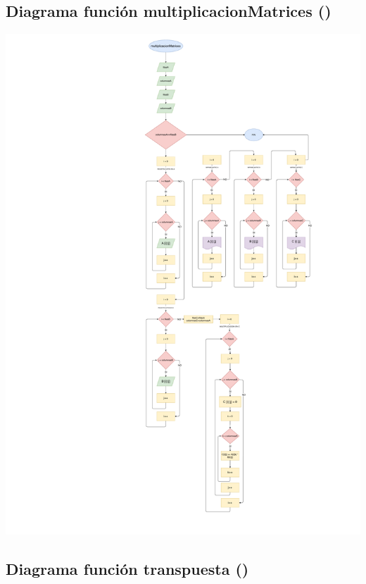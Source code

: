 \documentclass[letter]{revtex4}
\begin{document}
\subsection{Diagrama función multiplicacionMatrices ()}
\begin{center}
 	\includegraphics[scale=0.3]{Images/Multiplicacion.pdf}
 	\label{figura4}
 \end{center}
\clearpage


\subsection{Diagrama función transpuesta ()}
\end{document}
